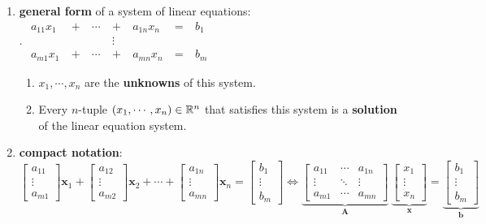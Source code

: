 \begin{enumerate}
    \item \textbf{general form} of a system of linear equations:
    \\
    .\hfill
    $
        \begin{aligned}
            a_{11}x_1\  & +\ & \cdots\ & +\ & a_{1n}x_n\ & =\ & b_1 \\
            & & & \vdots \\
            a_{m1}x_1\  & +\ & \cdots\ & +\ & a_{mn}x_n\ & =\ & b_m
        \end{aligned}
    $
    \hfill \cite{mfml/book/mml/Deisenroth-Faisal-Ong}
    \vspace{0.2cm}
    \begin{enumerate}
        \item $x_1, \cdots , x_n$ are the \textbf{unknowns} of this system.

        \item Every $n$-tuple $(x_1, \cdots , x_n) \in \mathbb{R}^n$ that satisfies this system is a \textbf{solution} of the linear equation system.
    \end{enumerate}


    \item \textbf{compact notation}:
    \\[0.2cm]
    $
        \begin{bmatrix}a_{11}\\ \vdots\\ a_{m1}\end{bmatrix} \bm{x}_1 +
        \begin{bmatrix}a_{12}\\ \vdots\\ a_{m2}\end{bmatrix} \bm{x}_2 +
        \cdots +
        \begin{bmatrix}a_{1n}\\ \vdots\\ a_{mn}\end{bmatrix} \bm{x}_n =
        \begin{bmatrix}b_{1}\\ \vdots\\ b_{m}\end{bmatrix}
    \Longleftrightarrow
        \underset{\displaystyle\bm{A}}{\underbrace{\begin{bmatrix}
            a_{11} & \cdots & a_{1n} \\
            \vdots & \ddots & \vdots \\
            a_{m1} & \cdots & a_{mn}
        \end{bmatrix}}} \
        \underset{\displaystyle\bm{x}}{\underbrace{\begin{bmatrix} x_{1} \\ \vdots \\ x_{n} \end{bmatrix}}}
        =
        \underset{\displaystyle\bm{b}}{\underbrace{\begin{bmatrix} b_{1} \\ \vdots \\ b_{m} \end{bmatrix}}}
    $
    \hfill \cite{mfml/book/mml/Deisenroth-Faisal-Ong}




\end{enumerate}
